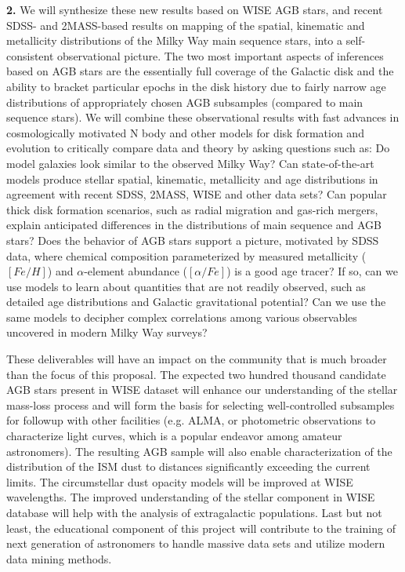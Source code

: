 {\bf 2.} We will synthesize these new results based on WISE AGB stars, and recent 
SDSS- and 2MASS-based results on mapping of the spatial, kinematic and metallicity 
distributions of the Milky Way main sequence stars, into a self-consistent observational
picture. The two most important aspects of inferences based on AGB stars are
the essentially full coverage of the Galactic disk and the ability to bracket particular 
epochs in the disk history due to fairly narrow age distributions of appropriately chosen
AGB subsamples (compared to main sequence stars). We will combine these observational 
results with fast advances in cosmologically motivated N body and other models for disk 
formation and evolution to critically compare data and 
theory by asking questions such as: Do model galaxies look similar to the observed Milky Way? 
Can state-of-the-art  models produce stellar spatial, kinematic, metallicity and age 
distributions in agreement with recent SDSS, 2MASS, WISE and other data sets?
Can popular thick disk formation scenarios, such as radial migration and gas-rich mergers, 
explain anticipated differences in the distributions of main sequence and AGB stars? 
Does the behavior of AGB stars support a picture, motivated by SDSS data, where
chemical composition parameterized by measured metallicity ($[Fe/H]$) and 
$\alpha$-element abundance ($[\alpha/Fe]$) is a good age tracer? If so, can we use 
models to learn about quantities that are not readily observed, such as detailed
age distributions and Galactic gravitational potential? Can we use the same models to 
decipher complex correlations among various observables uncovered in modern 
Milky Way surveys? 



These deliverables will have an impact on the community that is much broader 
than the focus of this proposal. The expected two hundred
thousand candidate AGB stars present in WISE dataset will enhance our
understanding of the stellar mass-loss process and will form the basis for selecting
well-controlled subsamples for followup with other facilities (e.g. ALMA, or
photometric observations to characterize light curves, which is a popular 
endeavor among amateur astronomers). The resulting AGB sample will also 
enable characterization of the distribution of the ISM dust to distances 
significantly exceeding the current limits. The circumstellar dust opacity 
models will be improved at WISE wavelengths.  The improved understanding 
of the  stellar component in WISE database will help with the analysis of extragalactic 
populations. Last but not least, the educational component of this project will
contribute to the training of next generation of astronomers to handle massive 
data sets and utilize modern data mining methods. 





